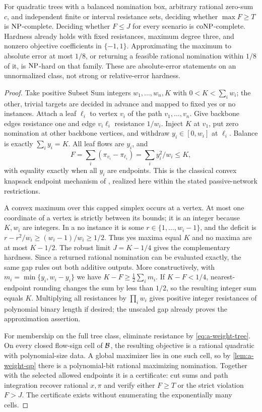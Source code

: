 \begin{theorem}
\label{thm:a-weight-tree-hard}
For quadratic trees with a balanced nomination box, arbitrary rational
zero-sum $c$, and independent finite or interval resistance sets, deciding
whether $\max F\ge T$ is $\mathrm{NP}$-complete. Deciding whether $F\le J$ for every
scenario is $\mathrm{coNP}$-complete. Hardness already holds with fixed resistances,
maximum degree three, and nonzero objective coefficients in $\{-1,1\}$.
Approximating the maximum to absolute error at most $1/8$, or returning
a feasible rational nomination within $1/8$ of it, is $\mathrm{NP}$-hard on
that family. These are absolute-error statements on an unnormalized
class, not strong or relative-error hardness.
\end{theorem}
\begin{proof}
Take positive Subset Sum integers $w_1,\ldots,w_n,K$ with
$0<K<\sum_iw_i$; the other, trivial targets are decided in advance and mapped to
fixed yes or no instances. Attach a leaf $\ell_i$ to vertex
$v_i$ of the path $v_1,\ldots,v_n$. Give backbone edges resistance one
and edge $v_i\ell_i$ resistance $1/w_i$. Inject $K$ at $v_1$, put zero
nomination at other backbone vertices, and withdraw
$y_i\in[0,w_i]$ at $\ell_i$. Balance is exactly $\sum_i y_i=K$.
All leaf flows are $y_i$, and
\[
 F=\sum_i(\pi_{v_i}-\pi_{\ell_i})
   =\sum_i y_i^2/w_i\le K,
\]
with equality exactly when all $y_i$ are endpoints. This is the classical
convex knapsack endpoint mechanism of
\citet[Proposition 1]{levi2014-convex-knapsack}, realized here within the
stated passive-network restrictions.

A convex maximum over this capped simplex occurs at a vertex. At most
one coordinate of a vertex is strictly between its bounds; it is an
integer because $K,w_i$ are integers. In a no instance it is some
$r\in\{1,\ldots,w_i-1\}$, and the deficit is
$r-r^2/w_i\ge(w_i-1)/w_i\ge1/2$.
Thus yes maxima equal $K$ and no maxima are at most $K-1/2$.
The robust limit $J=K-1/4$ gives the complementary hardness.
Since a returned rational nomination can be evaluated exactly, the same
gap rules out both additive outputs. More constructively, with
$m_i=\min\{y_i,w_i-y_i\}$ we have
$K-F\ge\tfrac12\sum_i m_i$. If $K-F<1/4$, nearest-endpoint rounding
changes the sum by less than $1/2$, so the resulting integer sum equals
$K$. Multiplying all resistances by $\prod_iw_i$ gives positive integer
resistances of polynomial binary length if desired; the unscaled gap
already proves the approximation assertion.

For membership on the full tree class, eliminate resistance by
\cref{eq:a-weight-tree}. On every closed flow-sign cell of $\mathcal{B}$,
the resulting objective is a rational quadratic with polynomial-size
data. A global maximizer lies in one such cell, so by
\cref{lem:a-weight-qp} there is a polynomial-bit rational maximizing
nomination. Together with the selected allowed endpoints it is a
certificate: cut sums and path integration recover rational $x,\pi$ and
verify either $F\ge T$ or the strict violation $F>J$. The certificate
exists without enumerating the exponentially many cells.
\end{proof}

